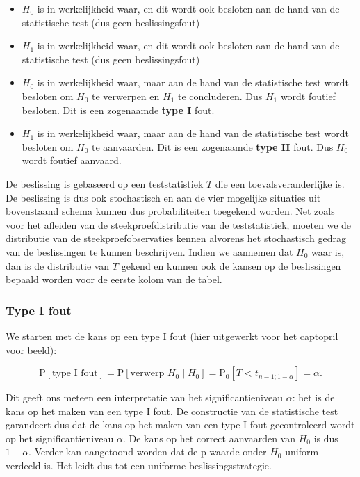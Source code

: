\documentclass[
  12pt,dutch,coursenotes]{book}
\theoremstyle{definition}
\theoremstyle{definition}
\theoremstyle{definition}
\theoremstyle{definition}
\theoremstyle{remark}
\begin{document}
\begin{itemize}
\item
  \(H_0\) is in werkelijkheid waar, en dit wordt ook besloten aan de hand van de statistische test (dus geen beslissingsfout)
\item
  \(H_1\) is in werkelijkheid waar, en dit wordt ook besloten aan de hand van de statistische test (dus geen beslissingsfout)
\item
  \(H_0\) is in werkelijkheid waar, maar aan de hand van de statistische test wordt besloten om \(H_0\) te verwerpen en \(H_1\) te concluderen. Dus \(H_1\) wordt foutief besloten. Dit is een zogenaamde \textbf{type I} fout.
\item
  \(H_1\) is in werkelijkheid waar, maar aan de hand van de statistische test wordt besloten om \(H_0\) te aanvaarden.
  Dit is een zogenaamde \textbf{type II} fout. Dus \(H_0\) wordt foutief aanvaard.
\end{itemize}

De beslissing is gebaseerd op een teststatistiek \(T\) die een toevalsveranderlijke is. De beslissing is dus ook stochastisch en aan de vier mogelijke situaties uit bovenstaand schema kunnen dus probabiliteiten toegekend worden. Net zoals voor het afleiden van de steekproefdistributie van de teststatistiek, moeten we de distributie van de steekproefobservaties kennen alvorens het stochastisch gedrag van de beslissingen te kunnen beschrijven. Indien we aannemen dat \(H_0\) waar is, dan is de distributie van \(T\) gekend en kunnen ook de kansen op de beslissingen bepaald worden voor de eerste kolom van de tabel.

\hypertarget{type-i-fout}{%
\subsubsection{Type I fout}\label{type-i-fout}}

We starten met de kans op een type I fout (hier uitgewerkt voor het captopril voor beeld):

\[\text{P}\left[\text{type I fout}\right]=\text{P}\left[\text{verwerp }H_0 \mid H_0\right] = \text{P}_0\left[T<t_{n-1;1-\alpha}\right]=\alpha.\]

Dit geeft ons meteen een interpretatie van het significantieniveau \(\alpha\): het is de kans op het maken van een type I fout. De constructie van de statistische test garandeert dus dat de kans op het maken van een type I fout gecontroleerd wordt op het significantieniveau \(\alpha\). De kans op het correct aanvaarden van \(H_0\) is dus \(1-\alpha\).
Verder kan aangetoond worden dat de p-waarde onder \(H_0\) uniform verdeeld is. Het leidt dus tot een uniforme beslissingsstrategie.
\end{document}
